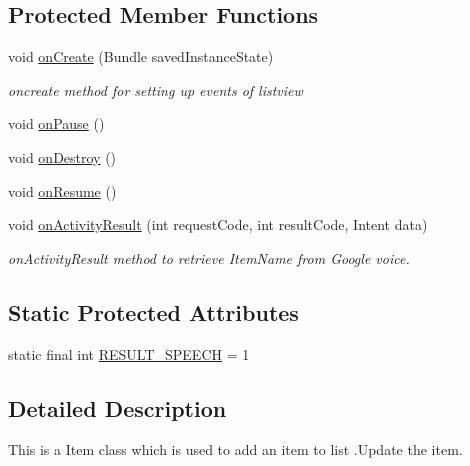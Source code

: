 \subsection*{Protected Member Functions}
\begin{DoxyCompactItemize}
\item 
void \hyperlink{classcom_1_1example_1_1santh_1_1shoppinglist_1_1_item_activity_a9f23bfc5355a38c404138c7e2447c5ee}{on\+Create} (Bundle saved\+Instance\+State)
\begin{DoxyCompactList}\small\item\em oncreate method for setting up events of listview \end{DoxyCompactList}\item 
void \hyperlink{classcom_1_1example_1_1santh_1_1shoppinglist_1_1_item_activity_abc6d112c1fe2a4963352d90f9660e61b}{on\+Pause} ()
\item 
void \hyperlink{classcom_1_1example_1_1santh_1_1shoppinglist_1_1_item_activity_af86ebc29ccb94493c7dabb4c516fd722}{on\+Destroy} ()
\item 
void \hyperlink{classcom_1_1example_1_1santh_1_1shoppinglist_1_1_item_activity_ab91c203e6db796ab67bbf3101f17b184}{on\+Resume} ()
\item 
void \hyperlink{classcom_1_1example_1_1santh_1_1shoppinglist_1_1_item_activity_a8a4a685a91426c5780e1260d7348e486}{on\+Activity\+Result} (int request\+Code, int result\+Code, Intent data)
\begin{DoxyCompactList}\small\item\em on\+Activity\+Result method to retrieve Item\+Name from Google voice. \end{DoxyCompactList}\end{DoxyCompactItemize}
\subsection*{Static Protected Attributes}
\begin{DoxyCompactItemize}
\item 
static final int \hyperlink{classcom_1_1example_1_1santh_1_1shoppinglist_1_1_item_activity_aea6bca838db9041a53ce0cdc68c0410b}{R\+E\+S\+U\+L\+T\+\_\+\+S\+P\+E\+E\+CH} = 1
\end{DoxyCompactItemize}


\subsection{Detailed Description}
This is a Item class which is used to add an item to list .Update the item. 

